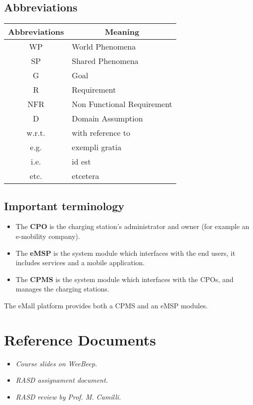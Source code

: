 \subsection{Abbreviations}

\begin{table}[H]
\centering
\begin{tabular}{|c|l|}
\hline
\rowcolor[HTML]{B8C8D5} 
\textbf{Abbreviations} & \multicolumn{1}{c|}{\cellcolor[HTML]{B8C8D5}\textbf{Meaning}} \\ \hline
WP & World Phenomena  \\ \hline
SP & Shared Phenomena \\ \hline
G  & Goal             \\ \hline
R  & Requirement             \\ \hline
NFR  & Non Functional Requirement             \\ \hline
D  & Domain Assumption             \\ \hline
w.r.t. & with reference to \\ \hline
e.g. & exempli gratia \\ \hline
i.e. & id est \\ \hline
etc. & etcetera \\ \hline
\end{tabular}
\end{table}
\subsection{Important terminology}
\begin{itemize}
    \item The \textbf{CPO} is the charging station’s administrator and owner (for example an e-mobility company).
    \item The \textbf{eMSP} is the system module which interfaces with the end users, it includes services and a mobile application.
    \item The \textbf{CPMS} is the system module which interfaces with the CPOs, and manages the charging stations.
\end{itemize}
The eMall platform provides both a CPMS and an eMSP modules.
\section{Reference Documents}
\begin{itemize}
    \item \emph{Course slides on WeeBeep.}
    \item \emph{RASD assignament document.}
    \item \emph{RASD review by Prof. M. Camilli.}
\end{itemize}

